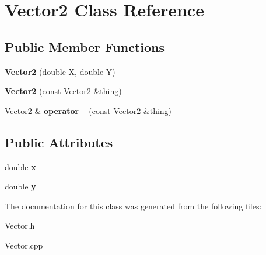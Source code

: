 \hypertarget{class_vector2}{}\section{Vector2 Class Reference}
\label{class_vector2}
\subsection*{Public Member Functions}
\begin{DoxyCompactItemize}
\item 
\hypertarget{class_vector2_ac01321dfaedc450692fecd7d6ddc1e4b}{}\label{class_vector2_ac01321dfaedc450692fecd7d6ddc1e4b} 
{\bfseries Vector2} (double X, double Y)
\item 
\hypertarget{class_vector2_a69d361c3d08e85232ac94c23988d35b7}{}\label{class_vector2_a69d361c3d08e85232ac94c23988d35b7} 
{\bfseries Vector2} (const \hyperlink{class_vector2}{Vector2} \&thing)
\item 
\hypertarget{class_vector2_a9108dc287c782b035ea9ea854aa945e2}{}\label{class_vector2_a9108dc287c782b035ea9ea854aa945e2} 
\hyperlink{class_vector2}{Vector2} \& {\bfseries operator=} (const \hyperlink{class_vector2}{Vector2} \&thing)
\end{DoxyCompactItemize}
\subsection*{Public Attributes}
\begin{DoxyCompactItemize}
\item 
\hypertarget{class_vector2_a61d73d9036ccbb3257fbe595c014a1d0}{}\label{class_vector2_a61d73d9036ccbb3257fbe595c014a1d0} 
double {\bfseries x}
\item 
\hypertarget{class_vector2_a4df9b2a8e79e6e30a7a3b34722d8b8b8}{}\label{class_vector2_a4df9b2a8e79e6e30a7a3b34722d8b8b8} 
double {\bfseries y}
\end{DoxyCompactItemize}


The documentation for this class was generated from the following files\+:\begin{DoxyCompactItemize}
\item 
Vector.\+h\item 
Vector.\+cpp\end{DoxyCompactItemize}
